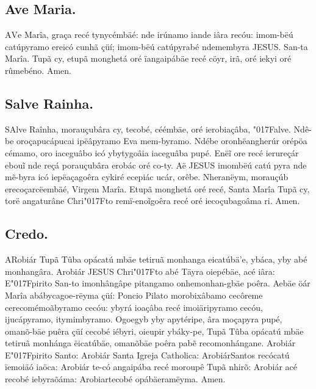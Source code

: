 \documentclass[openany,titlepage,12pt]{book}
\newcommand{\lgS}{\char"017F}
\begin{document}
\subsection{Ave Maria.}
\unskip\vspace*{-12pt}
\lettrine[findent =4pt, nindent=0pt, lines=2]
{A}{V}e Marîa, graça recé tynycémbäé:\linebreak
nde irúnamo iande iâra
recóu: imom-bëú catúpyramo ereicó cunhã çüí; imom-bëú catúpyrabé
ndemembyra JESUS. San-ta Marîa. Tupã cy, etupã monghetá oré 
ïangaipábäe recé cöyr, irã, oré iekyi oré rûmebéno. Amen.

\subsection{Salve Rainha.}

\lettrine[findent =4pt, nindent=0pt, lines=2]
{S}{A}lve Raînha, morauçubâra cy, tecobé, céémbäe, oré
ierobiaçâba, \lgS alve. Ndê-be oroçapucápucai ipëâpyramo Eva 
mem-byramo. Ndébe oronhëangherúr orépöa cémamo, oro iaceguâbo icó
ybytygoâia iaceguâba pupé. Enëĩ ore recé ierureçár\linebreak
ebouĩ nde reçá porauçubâra erobác oré co-ty.
Aë JESUS imombëú catú pyra nde mẽ-byra 
icó iepëaçagoêra cykiré ecepiác ucár, orêbe. Nheranëym,
morauçúb erecoçar\linebreak cëembäé, Virgem Marîa.
Etupã monghetá oré recé,
Santa Marîa Tupã cy, torë angaturâne Chri\lgS to remï-enoĩgoêra
recé oré iecoçubagoâma ri. Amen.

\subsection{Credo.}

\lettrine[findent =2pt, nindent=0pt, lines=2]
{A}{R}obiár Tupã Tûba opácatú mbäe tetiruã monhanga eicatúbä'e,
ybáca, yby abé monhangâra. Arobiár JESUS Chri\lgS to abé Täyra
oiepébäe, acé iâra: E\lgS pirito San-to imonhângâpe pitangamo
onhemonhan-gbäe poêra. Aebäe öár Marîa abábycagoe-rëyma çüí:
Poncio Pilato morobixâbamo cecôreme cerecomémoãbyramo cecóu:\linebreak
ybyrá ioaçâba recé imoiäripyramo cecóu,\linebreak
ijucápyramo, itymimbyramo. Ogoegyb\linebreak
yby apytéripe, âra moçapyra pupé, omanõ-bäe
puêra çüí cecobé iébyri, oieupir ybáky-pe, Tupã Tûba opácatú mbäe
tetiruã monhánga ëicatúbäe, omanõbäe poêra pabẽ\linebreak
recomonhángane. Arobiár E\lgS pirito Santo: Arobiár
Santa Igreja Catholica: Arobiár\linebreak Santos recócatú
ïemoiäó iaöca: Arobiár te-có angaipába recé moroupê Tupã nhirõ:\linebreak
Arobiár acé recobé iebyraõáma: Arobiar\linebreak tecobé opábäeramëyma.
Amen.
\end{document}
